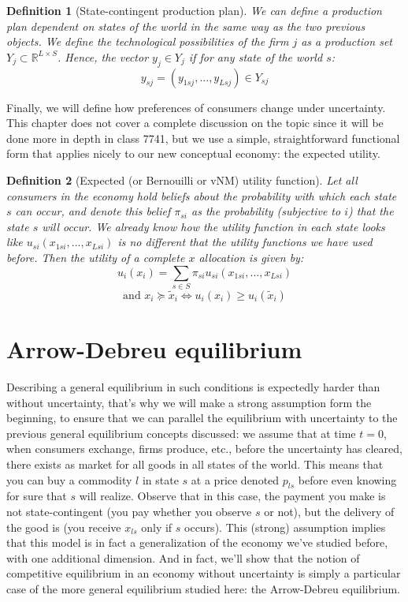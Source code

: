 \documentclass[12pt]{report}
\newtheorem{definition}{Definition}[chapter]
\begin{document}
\begin{definition}[State-contingent production plan]
We can define a production plan dependent on states of the world in the same way as the two previous objects. We define the technological possibilities of the firm $j$ as a production set $Y_j\subset \mathbb{R}^{L\times S}$. Hence, the vector $y_j \in Y_j$ if for any state of the world $s$: $$y_{sj} = (y_{1sj},..., y_{Lsj}) \in Y_{sj} $$
\end{definition}

Finally, we will define how preferences of consumers change under uncertainty. This chapter does not cover a complete discussion on the topic since it will be done more in depth in class 7741, but we use a simple, straightforward functional form that applies nicely to our new conceptual economy: the expected utility.

\begin{definition}[Expected (or Bernouilli or vNM) utility function]
Let all consumers in the economy hold beliefs about the probability with which each state $s$ can occur, and denote this belief $\pi_{si}$ as the probability (subjective to $i$) that the state $s$ will occur. We already know how the utility function in each state looks like $u_{si}(x_{1si}, ..., x_{Lsi})$ is no different that the utility functions we have used before.
Then the utility of a complete $x$ allocation is given by: $$u_{i}(x_i) = \sum_{s\in S} \pi_{si}u_{si}(x_{1si}, ..., x_{Lsi}) $$ $$\text{and } x_i\succeq \tilde x_i \Leftrightarrow u_{i}(x_i)\geq u_{i}(\tilde x_i) $$
\end{definition}

\section{Arrow-Debreu equilibrium}

Describing a general equilibrium in such conditions is expectedly harder than without uncertainty, that's why we will make a strong assumption form the beginning, to ensure that we can parallel the equilibrium with uncertainty to the previous general equilibrium concepts discussed: we assume that at time $t=0$, when consumers exchange, firms produce, etc., before the uncertainty has cleared, there exists as market for all goods in all states of the world. This means that you can buy a commodity $l$ in state $s$ at a price denoted $p_{ls}$ before even knowing for sure that $s$ will realize. Observe that in this case, the payment you make is not state-contingent (you pay whether you observe $s$ or not), but the delivery of the good is (you receive $x_{ls}$ only if $s$ occurs). This (strong) assumption implies that this model is in fact a generalization of the economy we've studied before, with one additional dimension. And in fact, we'll show that the notion of competitive equilibrium in an economy without uncertainty is simply a particular case of the more general equilibrium studied here: the Arrow-Debreu equilibrium.
\end{document}
